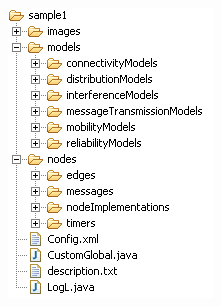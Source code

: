 \documentclass{beamer}
\begin{document}
\begin{frame}
\begin{columns}[c]
\begin{exampleblock}{}
\begin{figure}[t]
	\includegraphics[width=0.8\linewidth]{img/projectFolders}
\end{figure}
\end{exampleblock}

\end{columns}


\end{frame}

\end{document}
